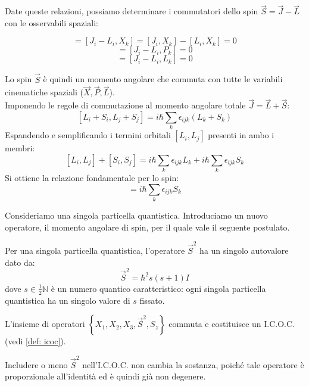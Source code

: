 Date queste relazioni, possiamo determinare i commutatori dello spin \(\vec{S} = \vec{J} - \vec{L}\) con le osservabili spaziali:

\begin{equation}
    [S_i, X_k] = [J_i - L_i, X_k] = [J_i, X_k] - [L_i, X_k] = 0
\end{equation}
\begin{equation}
    [S_i, P_k] = [J_i - L_i, P_k] = 0
\end{equation}
\begin{equation}
    [S_i, L_k] = [J_i - L_i, L_k] = 0
\end{equation}

Lo spin \(\vec{S}\) è quindi un momento angolare che commuta con tutte le variabili cinematiche spaziali (\(\vec{X}, \vec{P}, \vec{L}\)).\\
Imponendo le regole di commutazione al momento angolare totale \(\vec{J} = \vec{L} + \vec{S}\):
\[
[L_i + S_i, L_j + S_j] = i\hbar \sum_k \epsilon_{ijk} (L_k + S_k)
\]
Espandendo e semplificando i termini orbitali \([L_i, L_j]\) presenti in ambo i membri:
\[
[L_i, L_j] + [S_i, S_j] = i\hbar \sum_k \epsilon_{ijk} L_k + i\hbar \sum_k \epsilon_{ijk} S_k
\]
Si ottiene la relazione fondamentale per lo spin:
\begin{equation}
    [S_i, S_j] = i\hbar \sum_k \epsilon_{ijk} S_k
\end{equation}



Consideriamo una singola particella quantistica. Introduciamo un nuovo operatore, il momento angolare di spin, per il quale vale il seguente postulato.

\begin{postulato8}
    Per una singola particella quantistica, l'operatore \(\vec{S}^2\) ha un singolo autovalore dato da:
    \begin{equation}
        \vec{S}^2 = \hbar^2 s(s+1) I
    \end{equation}
    dove \(s \in \frac{1}{2}\mathbb{N}\) è un numero quantico caratteristico: ogni singola particella quantistica ha un singolo valore di \(s\) fissato.
\end{postulato8}

L'insieme di operatori \(\left\{ X_1, X_2, X_3, \vec{S}^2, S_z \right\}\) commuta e costituisce un I.C.O.C. (vedi \ref{def: icoc}).
\begin{remark}
    Includere o meno \(\vec{S}^2\) nell'I.C.O.C. non cambia la sostanza, poiché tale operatore è proporzionale all'identità ed è quindi già non degenere.
\end{remark}


